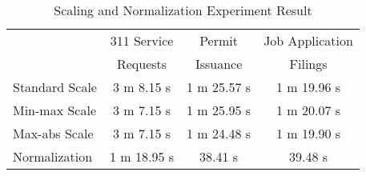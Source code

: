 \documentclass[sigconf]{acmart}
\begin{document}
\begin{table}
\caption{Scaling and Normalization Experiment Result}   
\label{tab:Scaling and Normalization Experiment Result}
\begin{tabular}{lccc}   
 	                      &  311 Service  &  Permit    &  Job Application \\ &Requests&Issuance&Filings   \\  
\hline
Standard Scale   & 3 m 8.15 s     & 1 m 25.57 s & 1 m 19.96 s            \\ 
Min-max Scale  &  3 m 7.15 s   & 1 m 25.95 s  & 1 m 20.07 s             \\  
Max-abs Scale  & 3 m 7.15 s     &  1 m 24.48 s  & 1 m 19.90 s             \\ 
Normalization    & 1 m 18.95 s     &  38.41 s & 39.48 s             \\ 

\end{tabular}   
\end{table}
\end{document}
